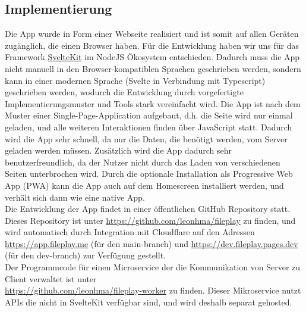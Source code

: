 \documentclass[a4paper]{article}
\begin{document}
\subsection{Implementierung}
Die App wurde in Form einer Webseite realisiert und ist somit auf allen Geräten
zugänglich, die einen Browser haben. Für die Entwicklung haben wir uns für das
Framework \href{https://kit.svelte.dev/}{SvelteKit} im NodeJS Ökosystem
entschieden. Dadurch muss die App nicht manuell in den Browser-kompatiblen
Sprachen geschrieben werden, sondern kann in einer modernen Sprache (Svelte in
Verbindung mit Typescript) geschrieben werden, wodurch die Entwicklung durch
vorgefertigte Implementierungsmuster und Tools stark vereinfacht wird. Die App
ist nach dem Muster einer Single-Page-Application aufgebaut, d.h. die Seite wird
nur einmal geladen, und alle weiteren Interaktionen finden über JavaScript
statt. Dadurch wird die App sehr schnell, da nur die Daten, die benötigt werden,
vom Server geladen werden müssen. Zusätzlich wird die App dadurch sehr
benutzerfreundlich, da der Nutzer nicht durch das Laden von verschiedenen Seiten
unterbrochen wird. Durch die optionale Installation als Progressive Web App
(PWA) kann die App auch auf dem Homescreen installiert werden, und verhält sich
dann wie eine native App.\\
Die Entwicklung der App findet in einer öffentlichen GitHub Repository statt.
Dieses Repository ist unter \url{https://github.com/leonhma/fileplay} zu finden,
und wird automatisch durch Integration mit Cloudflare auf den Adressen
\url{https://app.fileplay.me} (für den {main}-branch) und
\url{https://dev.fileplay.pages.dev} (für den {dev}-branch) zur Verfügung gestellt.\\
Der Programmcode für einen Microservice der die Kommunikation von Server zu
Client verwaltet ist unter \\\url{https://github.com/leonhma/fileplay-worker} zu
finden. Dieser Mikroservice nutzt APIs die nicht in SvelteKit verfügbar sind,
und wird deshalb separat gehosted.
\end{document}
